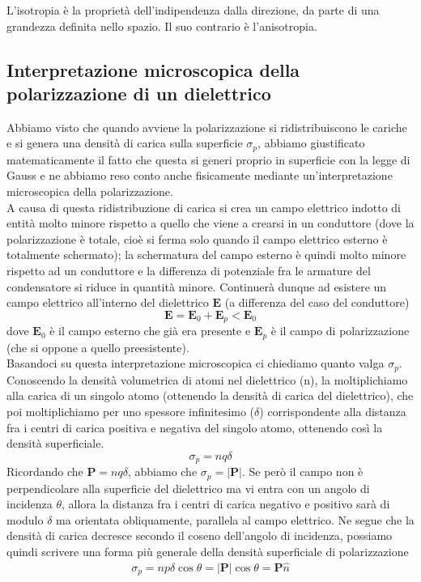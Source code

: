 \documentclass[
10pt, %
a4paper, %
oneside, %
headinclude,footinclude, %
BCOR5mm, %
]{scrartcl}
\begin{document}
\begin{definizione}
	L'isotropia è la proprietà dell'indipendenza dalla direzione, da parte di una grandezza definita nello spazio. Il suo contrario è l'anisotropia.
\end{definizione}
\subsection{Interpretazione microscopica della polarizzazione di un dielettrico}
Abbiamo visto che quando avviene la polarizzazione si ridistribuiscono le cariche e si genera una densità di carica sulla superficie \(\sigma_p\), abbiamo giustificato matematicamente il fatto che questa si generi proprio in superficie con la legge di Gauss e ne abbiamo reso conto anche fisicamente mediante un'interpretazione microscopica della polarizzazione.\\
A causa di questa ridistribuzione di carica si crea un campo elettrico indotto di entità molto minore rispetto a quello che viene a crearsi in un conduttore (dove la polarizzazione è totale, cioè si ferma solo quando il campo elettrico esterno è totalmente schermato); la schermatura del campo esterno è quindi molto minore rispetto ad un conduttore e la differenza di potenziale fra le armature del condensatore si riduce in quantità minore. Continuerà dunque ad esistere un campo elettrico all'interno del dielettrico $\mathbf{E}$ (a differenza del caso del conduttore)
\[\mathbf{E} = \mathbf{E}_0+\mathbf{E}_p<\mathbf{E}_0\]
dove $\mathbf{E}_0$ è il campo esterno che già era presente e $\mathbf{E}_p$ è il campo di polarizzazione (che si oppone a quello preesistente).\\
Basandoci su questa interpretazione microscopica ci chiediamo quanto valga $\sigma_p$. Conoscendo la densità volumetrica di atomi nel dielettrico (n), la moltiplichiamo alla carica di un singolo atomo (ottenendo la densità di carica del dielettrico), che poi moltiplichiamo per uno spessore infinitesimo (\(\delta\)) corrispondente alla distanza fra i centri di carica positiva e negativa del singolo atomo, ottenendo così la densità superficiale.
\[\sigma_p = n q \delta\]
Ricordando che \(\mathbf{P} = nq\delta\), abbiamo che $\sigma_p = |\mathbf{P}|$. Se però il campo non è perpendicolare alla superficie del dielettrico ma vi entra con un angolo di incidenza $\theta$, allora la distanza fra i centri di carica negativo e positivo sarà di modulo $\delta$ ma orientata obliquamente, parallela al campo elettrico. Ne segue che la densità di carica decresce secondo il coseno dell'angolo di incidenza, possiamo quindi scrivere una forma più generale della densità superficiale di polarizzazione
\begin{align}\label{eq:densità_polarizzazione}
	\sigma_p = np\delta \cos\theta= |\mathbf{P}|\cos\theta = \mathbf{P}\hat{n}
\end{align}
\end{document}
